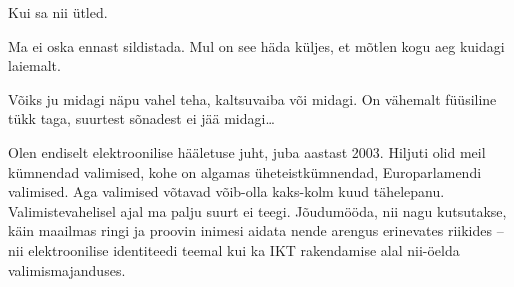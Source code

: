 


Kui sa nii ütled.


Ma ei oska ennast sildistada. Mul on see häda küljes, et mõtlen kogu aeg kuidagi 
laiemalt.


Võiks ju midagi näpu vahel teha, kaltsuvaiba või midagi. On vähemalt füüsiline tükk taga, 
suurtest sõnadest ei jää midagi\ldots


Olen endiselt elektroonilise hääletuse juht, juba aastast 2003. 
Hiljuti olid meil kümnendad valimised, kohe on algamas üheteistkümnendad, 
Europarlamendi valimised. Aga valimised võtavad võib-olla 
kaks-kolm kuud tähelepanu. Valimistevahelisel ajal ma palju 
suurt ei teegi. Jõudumööda, nii nagu kutsutakse, käin maailmas ringi ja proovin 
inimesi aidata nende arengus erinevates riikides -- nii 
elektroonilise identiteedi teemal kui ka IKT rakendamise alal 
nii-öelda valimismajanduses.

